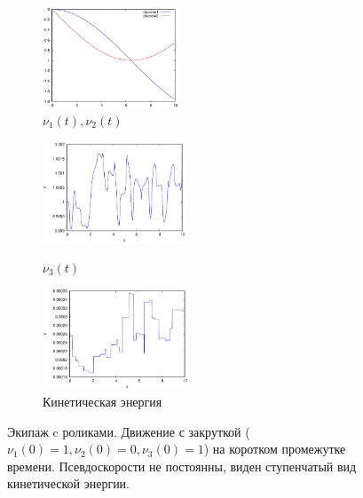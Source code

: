 \begin{figure}
    \begin{subfigure}[t]{0.3\textwidth}
        \centering
        \includegraphics[width=\linewidth, height=30mm]{pic/_sol__1_0_1__0__10__1e2_nu12_centered}
        \caption{$\nu_1(t), \nu_2(t)$}
        \label{fig:_sol__1_0_1__0__10__1e2_nu12_centered}    
    \end{subfigure}
    \hfill
    \begin{subfigure}[t]{0.3\textwidth}
        \centering
        \includegraphics[width=\linewidth, height=30mm]{pic/_sol__1_0_1__0__10__1e2_nu3} \\
        \caption{$\nu_3(t)$}
        \label{fig:_sol__1_0_1__0__10__1e2_nu3}
    \end{subfigure}
    \hfill
    \begin{subfigure}[t]{0.3\textwidth}
        \centering
        \includegraphics[width=\linewidth, height=30mm]{pic/_sol__1_0_1__0__10__1e2_kin_en}
        \caption{Кинетическая энергия}
        \label{fig:_sol__1_0_1__0__10__1e2_kin_en}
    \end{subfigure}
    
    \caption{Экипаж c роликами. Движение с закруткой ($\nu_1(0) = 1, \nu_2(0) = 0, \nu_3(0) = 1$) на коротком промежутке времени. Псевдоскорости не постоянны, виден ступенчатый вид кинетической энергии.}
    \label{fig:wrench_short}
\end{figure}
